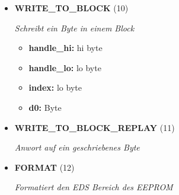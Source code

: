 \begin{itemize}
\item \textbf{WRITE\_TO\_BLOCK} (10)

\textit{Schreibt ein Byte in einem Block}

\small
\begin{itemize}
		
\item \textbf{handle\_hi:} hi byte
\item \textbf{handle\_lo:} lo byte
\item \textbf{index:} lo byte
\item \textbf{d0:} Byte
\end{itemize}
\normalsize
	
\item \textbf{WRITE\_TO\_BLOCK\_REPLAY} (11)

\textit{Anwort auf ein geschriebenes Byte}

\item \textbf{FORMAT} (12)

\textit{Formatiert den EDS Bereich des EEPROM}

\end{itemize}
	

